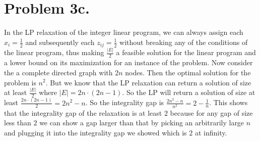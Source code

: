 \documentclass[12pt]{article}
\begin{document}
\section*{Problem 3c.}
In the LP relaxation of the integer linear program, we can always assign each
$x_i = \frac{1}{2}$ and subsequently each $z_{ij} = \frac{1}{2}$ without
breaking any of the conditions of the linear program, thus making
$\frac{|E|}{2}$ a feasible solution for the linear program and a lower bound on
its maximization for an instance of the problem. Now consider the a complete
directed graph with $2n$ nodes. Then the optimal solution for the problem is
$n^2$. But we know that the LP relaxation can return a solution of size at least
$\frac{|E|}{2}$ where $|E| = 2n\cdot(2n-1)$. So the LP will return a solution of
size at least $\frac{2n\cdot(2n-1)}{2} = 2n^2-n$. So the integrality gap is
$\frac{2n^2-n}{n^2} = 2 - \frac{1}{n}$. This shows that the integrality gap
of the relaxation is at least $2$ because for any gap of size less than $2$
we can show a gap larger than that by picking an arbitrarily large $n$ and
plugging it into the integrality gap we showed which is $2$ at infinity.
\end{document}
